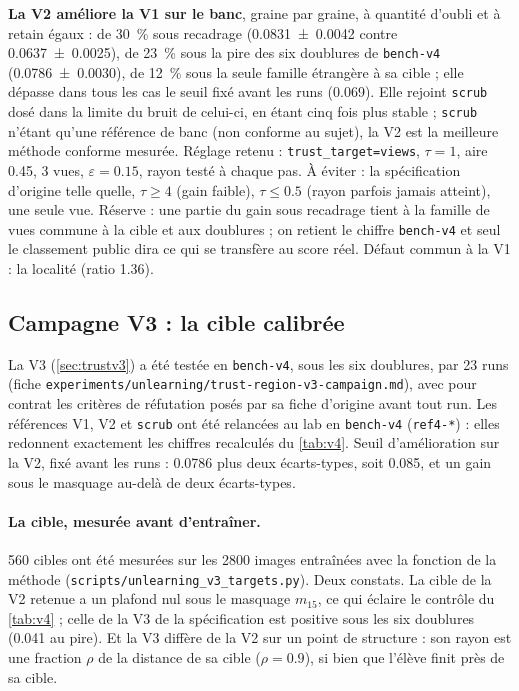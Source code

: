 \documentclass[11pt,a4paper]{article}
\newcommand{\code}[1]{\texttt{#1}}
\newcommand{\chemin}[1]{\nolinkurl{#1}}%
\begin{document}
\begin{retenir}
\textbf{La V2 améliore la V1 sur le banc}, graine par graine, à quantité d'oubli et à retain
égaux : de \SI{30}{\percent} sous recadrage (\num{0.0831 +- 0.0042} contre \num{0.0637 +- 0.0025}),
de \SI{23}{\percent} sous la pire des six doublures de \code{bench-v4} (\num{0.0786 +- 0.0030}), de
\SI{12}{\percent} sous la seule famille étrangère à sa cible ; elle dépasse dans tous les cas le
seuil fixé avant les runs (\num{0.069}). Elle rejoint \code{scrub} dosé dans la limite du bruit de
celui-ci, en étant cinq fois plus stable ; \code{scrub} n'étant qu'une référence de banc (non
conforme au sujet), la V2 est la meilleure méthode conforme mesurée. Réglage retenu : \code{trust\_target=views},
$\tau=1$, aire \num{0.45}, 3 vues, $\varepsilon=\num{0.15}$, rayon testé à chaque pas. À éviter : la
spécification d'origine telle quelle, $\tau\ge4$ (gain faible), $\tau\le\num{0.5}$ (rayon parfois
jamais atteint), une seule vue. Réserve : une partie du gain sous recadrage tient à la famille de
vues commune à la cible et aux doublures ; on retient le chiffre \code{bench-v4} et seul le
classement public dira ce qui se transfère au score réel. Défaut commun à la V1 : la localité
(ratio \num{1.36}).
\end{retenir}

\subsection{Campagne V3 : la cible calibrée}\label{sec:campagnev3}
La V3 (\cref{sec:trustv3}) a été testée en \code{bench-v4}, sous les six doublures, par 23 runs
(fiche \chemin{experiments/unlearning/trust-region-v3-campaign.md}), avec pour contrat les critères
de réfutation posés par sa fiche d'origine avant tout run. Les références V1, V2 et \code{scrub}
ont été relancées au lab en \code{bench-v4} (\code{ref4-*}) : elles redonnent exactement les chiffres
recalculés du \cref{tab:v4}. Seuil d'amélioration sur la V2, fixé avant les runs : \num{0.0786} plus
deux écarts-types, soit \num{0.085}, et un gain sous le masquage au-delà de deux écarts-types.

\paragraph{La cible, mesurée avant d'entraîner.} 560 cibles ont été mesurées sur les 2800 images
entraînées avec la fonction de la méthode (\chemin{scripts/unlearning\_v3\_targets.py}). Deux
constats. La cible de la V2 retenue a un plafond nul sous le masquage $m_{15}$, ce qui éclaire le
contrôle du \cref{tab:v4} ; celle de la V3 de la spécification est positive sous les six doublures
(\num{0.041} au pire). Et la V3 diffère de la V2 sur un point de structure : son rayon est une
fraction $\rho$ de la distance de sa cible ($\rho=\num{0.9}$), si bien que l'élève finit près de sa
cible.
\end{document}
